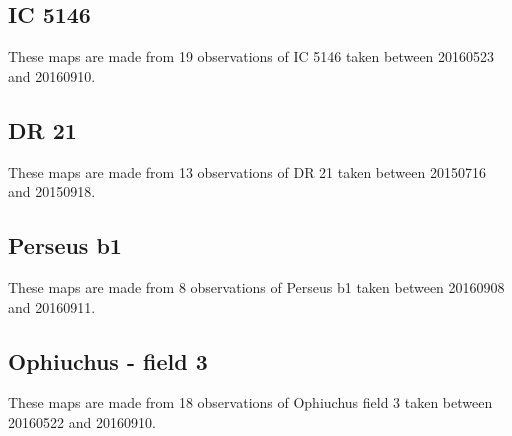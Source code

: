 \documentclass[twoside,11pt]{starlink}
\begin{document}
\subsection{IC 5146}
These maps are made from 19 observations of IC 5146 taken between
20160523 and 20160910.











\subsection{DR 21}
These maps are made from 13 observations of DR 21 taken between 20150716 and
20150918.











\subsection{Perseus b1}
These maps are made from 8 observations of Perseus b1 taken between
20160908 and 20160911.










\subsection{Ophiuchus - field 3}
These maps are made from 18 observations of Ophiuchus field 3 taken between
20160522 and 20160910.









\end{document}
